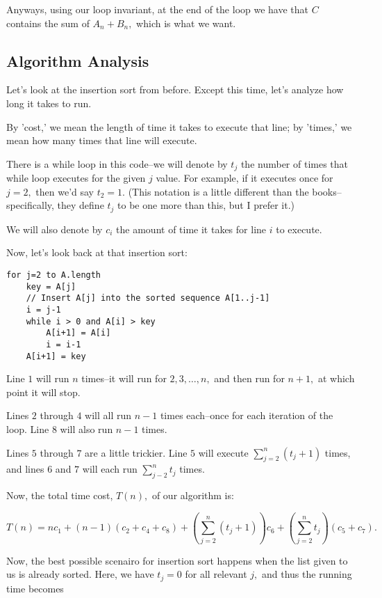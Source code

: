 \documentclass{article}
\begin{document}
Anyways, using our loop invariant, at the end of the loop we have that $C$ contains the sum of $A_n + B_n,$ which is what we want.

\subsection{Algorithm Analysis}

Let's look at the insertion sort from before. Except this time, let's analyze how long it takes to run.

By 'cost,' we mean the length of time it takes to execute that line; by 'times,' we mean how many times that line will execute.

There is a while loop in this code--we will denote by $t_j$ the number of times that while loop executes for the given $j$ value. For example, if it executes once for $j=2,$ then we'd say $t_2 = 1.$ (This notation is a little different than the books--specifically, they define $t_j$ to be one more than this, but I prefer it.)

We will also denote by $c_i$ the amount of time it takes for line $i$ to execute.

Now, let's look back at that insertion sort:

\begin{lstlisting}
for j=2 to A.length             
	key = A[j]	        
	// Insert A[j] into the sorted sequence A[1..j-1]
	i = j-1                 
	while i > 0 and A[i] > key
		A[i+1] = A[i]
		i = i-1
	A[i+1] = key
\end{lstlisting}

Line $1$ will run $n$ times--it will run for $2, 3, \dots, n,$ and then run for $n+1,$ at which point it will stop. 

Lines $2$ through $4$ will all run $n-1$ times each--once for each iteration of the loop. Line $8$ will also run $n-1$ times.

Lines $5$ through $7$ are a little trickier. Line $5$ will execute $\sum_{j=2}^n (t_j+1)$ times, and lines $6$ and $7$ will each run $\sum_{j-2}^{n} t_j$ times.

Now, the total time cost, $T(n),$ of our algorithm is:

$$T(n) = nc_1 + (n-1)(c_2 + c_4 + c_8) + (\sum_{j=2}^{n} (t_j+1))c_6 + (\sum_{j=2}^n t_j)(c_5 + c_7).$$

Now, the best possible scenairo for insertion sort happens when the list given to us is already sorted. Here, we have $t_j = 0$ for all relevant $j,$ and thus the running time becomes
\end{document}
